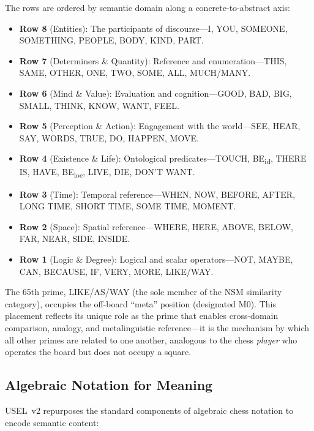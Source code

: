 \documentclass[11pt,a4paper]{article}
\begin{document}
The rows are ordered by semantic domain along a concrete-to-abstract axis:
\begin{itemize}[nosep]
    \item \textbf{Row 8} (Entities): The participants of discourse---I, YOU, SOMEONE, SOMETHING, PEOPLE, BODY, KIND, PART.
    \item \textbf{Row 7} (Determiners \& Quantity): Reference and enumeration---THIS, SAME, OTHER, ONE, TWO, SOME, ALL, MUCH/MANY.
    \item \textbf{Row 6} (Mind \& Value): Evaluation and cognition---GOOD, BAD, BIG, SMALL, THINK, KNOW, WANT, FEEL.
    \item \textbf{Row 5} (Perception \& Action): Engagement with the world---SEE, HEAR, SAY, WORDS, TRUE, DO, HAPPEN, MOVE.
    \item \textbf{Row 4} (Existence \& Life): Ontological predicates---TOUCH, BE\textsubscript{id}, THERE IS, HAVE, BE\textsubscript{loc}, LIVE, DIE, DON'T WANT.
    \item \textbf{Row 3} (Time): Temporal reference---WHEN, NOW, BEFORE, AFTER, LONG TIME, SHORT TIME, SOME TIME, MOMENT.
    \item \textbf{Row 2} (Space): Spatial reference---WHERE, HERE, ABOVE, BELOW, FAR, NEAR, SIDE, INSIDE.
    \item \textbf{Row 1} (Logic \& Degree): Logical and scalar operators---NOT, MAYBE, CAN, BECAUSE, IF, VERY, MORE, LIKE/WAY.
\end{itemize}

The 65th prime, LIKE/AS/WAY (the sole member of the NSM similarity category), occupies the off-board ``meta'' position (designated M0). This placement reflects its unique role as the prime that enables cross-domain comparison, analogy, and metalinguistic reference---it is the mechanism by which all other primes are related to one another, analogous to the chess \emph{player} who operates the board but does not occupy a square.

\subsection{Algebraic Notation for Meaning}
\label{sec:algebraic-notation}

USEL~v2 repurposes the standard components of algebraic chess notation to encode semantic content:
\end{document}
